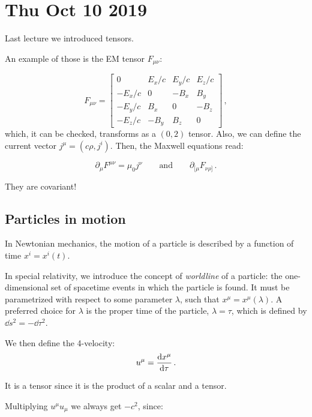 \documentclass[main.tex]{subfiles}
\begin{document}
\section*{Thu Oct 10 2019}

Last lecture we introduced tensors.

An example of those is the EM tensor \(F_{\mu \nu}\):

\begin{equation}
  F_{\mu \nu} = \left[\begin{array}{cccc}
  0 & E_{x}/c & E_y/c & E_z/c \\ 
  -E_x/c & 0 & -B_x & B_y \\ 
  -E_y/c & B_x & 0 & -B_z \\ 
  -E_z/c & -B_y & B_z & 0
  \end{array}\right]\,,
\end{equation}
%
which, it can be checked, transforms as a \((0,2)\) tensor. Also, we can define the current vector \(j^{\mu} = (c \rho, j^{i})\). Then, the Maxwell equations read:

\begin{equation}
  \partial_{\mu} F^{\mu \nu }= \mu_0 j^{\nu}
  \qquad \text{and} \qquad
  \partial_{[\mu} F_{\nu \rho]}\,.
\end{equation}

They are covariant!

\subsection{Particles in motion}

In Newtonian mechanics, the motion of a particle is described by a function of time \(x^{i} = x^{i}(t)\).

In special relativity, we introduce the concept of \emph{worldline} of a particle: the one-dimensional set of spacetime events in which the particle is found.
It must be parametrized with respect to some parameter \(\lambda\), such that \(x^{\mu} = x^{\mu}(\lambda)\). A preferred choice for \(\lambda\) is the proper time of the particle, \(\lambda = \tau\), which is defined by \( \dd{s^2} = - \dd{\tau^2}\). 

We then define the 4-velocity:
%
\begin{equation}
  u^\mu = \dv{x ^\mu}{\tau} \,.
\end{equation}

It is a tensor since it is the product of a scalar and a tensor.

Multiplying \(u^\mu u_{\mu}\) we always get \(-c^{2}\), since:
\end{document}
